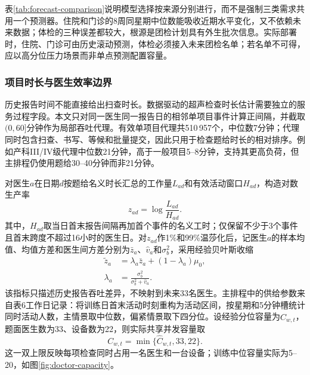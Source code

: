 \begin{table}[H]
\centering
\caption{开单日需求预测的留出期WAPE比较}
\label{tab:forecast-comparison}

\end{table}

表\ref{tab:forecast-comparison}说明模型选择按来源分别进行，而不是强制三类需求共用一个预测器。住院和门诊的8周同星期中位数能吸收近期水平变化，又不依赖未来数据；体检的三种误差都较大，根源是团检计划具有外生批次信息。实际部署时，住院、门诊可由历史滚动预测，体检必须接入未来团检名单；若名单不可得，应以高分位压力场景而非单点预测配置容量。

\subsubsection{项目时长与医生效率边界}

历史报告时间不能直接给出扫查时长。数据驱动的超声检查时长估计需要独立的服务过程字段\cite{lai2025}。本文只对同一医生同一报告日的相邻单项目事件计算正间隔，并截取$(0,60]$分钟作为局部吞吐代理。有效单项目代理共510\,957个，中位数7分钟；代理同时包含扫查、书写、等候和批量提交，因此只用于检查题给时长的相对排序。例如产科III/IV级代理中位数21分钟，高于一般项目5--8分钟，支持其更高负荷，但主排程仍使用题给30--40分钟而非21分钟。

对医生$a$在日期$d$按题给名义时长汇总的工作量$L_{ad}$和有效活动窗口$H_{ad}$，构造对数生产率
\begin{equation}
z_{ad}=\log\frac{L_{ad}}{H_{ad}}.
\end{equation}
其中，$H_{ad}$取当日首末报告间隔再加首个事件的名义工时；仅保留不少于3个事件且首末跨度不超过16小时的医生日。对$z_{ad}$作1\%和99\%温莎化后，记医生$a$的样本均值、均值方差和医生间方差分别为$\bar z_a$、$\widehat v_a$和$\sigma_b^2$，采用经验贝叶斯收缩
\begin{align}
\widetilde z_a&=\lambda_a\bar z_a+(1-\lambda_a)\mu_0,\\
\lambda_a&=\frac{\sigma_b^2}{\sigma_b^2+\widehat v_a}.
\end{align}
该指标只描述历史报告吞吐差异，不映射到未来33名医生。主排程中的供给参数来自表6工作日记录：将训练日首末活动时刻重构为活动区间，按星期和5分钟槽统计同时活动人数，主情景取中位数，偏紧情景取下四分位。设经验分位容量为$\widehat C_{w,t}$，题面医生数为33、设备数为22，则实际共享并发容量取
\begin{equation}
C_{w,t}=\min\{\widehat C_{w,t},33,22\}.
\end{equation}
这一双上限反映每项检查同时占用一名医生和一台设备；训练中位容量实际为5--20，如图\ref{fig:doctor-capacity}。

